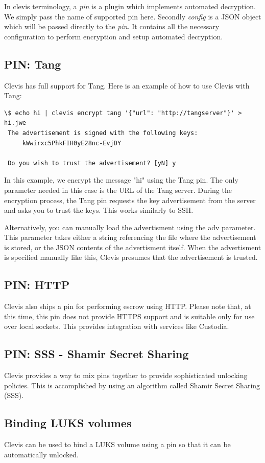 In clevis terminology, a {\it pin} is a plugin which implements automated decryption.
We simply pass the name of supported pin here.
Secondly {\it config} is a JSON object which will be passed directly to the {\it pin}.
It contains all the necessary configuration to perform encryption and setup automated decryption.

\subsection{PIN: Tang}
Clevis has full support for Tang. Here is an example of how to use Clevis with Tang:
\begin{lstlisting}[columns=fixed,tabsize=4,backgroundcolor=\color{yellow!10}]
\$ echo hi | clevis encrypt tang '{"url": "http://tangserver"}' > hi.jwe
 The advertisement is signed with the following keys:
     kWwirxc5PhkFIH0yE28nc-EvjDY

 Do you wish to trust the advertisement? [yN] y
\end{lstlisting}
In this example, we encrypt the message "hi" using the Tang pin.
The only parameter needed in this case is the URL of the Tang server.
During the encryption process, the Tang pin requests the key advertisement from the server and asks you to trust the keys.
This works similarly to SSH.

Alternatively, you can manually load the advertisment using the adv parameter.
This parameter takes either a string referencing the file where the advertisement is stored, or the JSON contents of the advertisment itself.
When the advertisment is specified manually like this, Clevis presumes that the advertisement is trusted.
\subsection{PIN: HTTP}
Clevis also ships a pin for performing escrow using HTTP.
Please note that, at this time, this pin does not provide HTTPS support and is suitable only for use over local sockets.
This provides integration with services like Custodia.

\subsection{PIN: SSS - Shamir Secret Sharing}
Clevis provides a way to mix pins together to provide sophisticated unlocking policies.
This is accomplished by using an algorithm called Shamir Secret Sharing (SSS).

\subsection{Binding LUKS volumes}
Clevis can be used to bind a LUKS volume using a pin so that it can be automatically unlocked.

